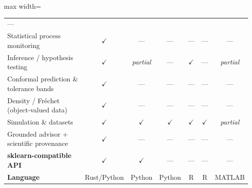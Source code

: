 \begin{table}[htbp]
\begin{adjustbox}{max width=\textwidth}
\begin{tabular}{lcccccc}
  --- \\
Statistical process monitoring &
  $\checkmark$ &
  --- &
  --- &
  --- &
  --- &
  --- \\
Inference / hypothesis testing &
  $\checkmark$ &
  \textit{partial} &
  --- &
  $\checkmark$ &
  --- &
  \textit{partial} \\
Conformal prediction \& tolerance bands &
  $\checkmark$ &
  --- &
  --- &
  --- &
  --- &
  --- \\
Density / Fr\'{e}chet (object-valued data) &
  $\checkmark$ &
  --- &
  --- &
  --- &
  --- &
  --- \\
Simulation \& datasets &
  $\checkmark$ &
  $\checkmark$ &
  $\checkmark$ &
  $\checkmark$ &
  $\checkmark$ &
  \textit{partial} \\
Grounded advisor + scientific provenance &
  $\checkmark$ &
  --- &
  --- &
  --- &
  --- &
  --- \\
\midrule
\textbf{sklearn-compatible API} &
  $\checkmark$ &
  $\checkmark$ &
  --- &
  --- &
  --- &
  --- \\
\textbf{Language} &
  Rust/Python &
  Python &
  Python &
  R &
  R &
  MATLAB \\
\bottomrule
\end{tabular}
\end{adjustbox}
\end{table}
